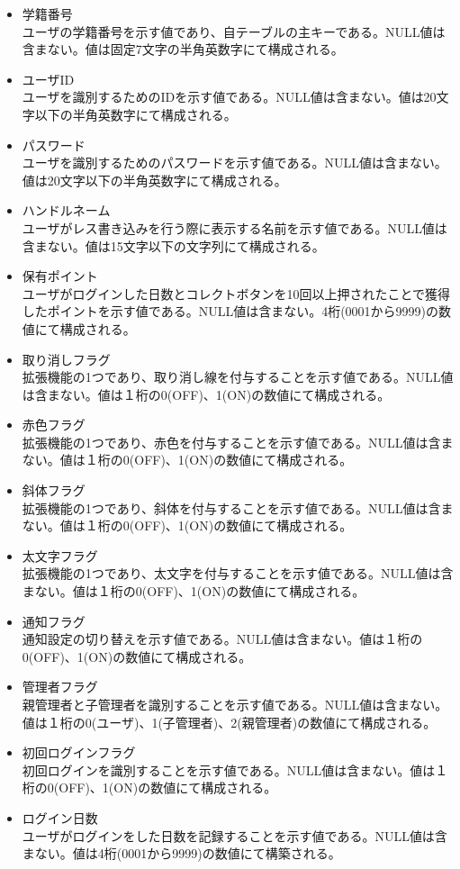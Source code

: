 \documentclass[a4j]{jarticle}
\begin{document}
\begin{itemize}
\item 学籍番号\\
  ユーザの学籍番号を示す値であり、自テーブルの主キーである。NULL値は含まない。値は固定7文字の半角英数字にて構成される。
\item ユーザID\\
  ユーザを識別するためのIDを示す値である。NULL値は含まない。値は20文字以下の半角英数字にて構成される。
\item パスワード\\
  ユーザを識別するためのパスワードを示す値である。NULL値は含まない。値は20文字以下の半角英数字にて構成される。
\item ハンドルネーム\\
      ユーザがレス書き込みを行う際に表示する名前を示す値である。NULL値は含まない。値は15文字以下の文字列にて構成される。


\item 保有ポイント\\
  ユーザがログインした日数とコレクトボタンを10回以上押されたことで獲得したポイントを示す値である。NULL値は含まない。4桁(0001から9999)の数値にて構成される。

\item 取り消しフラグ\\
  拡張機能の1つであり、取り消し線を付与することを示す値である。NULL値は含まない。値は１桁の0(OFF)、1(ON)の数値にて構成される。

\item 赤色フラグ\\
  拡張機能の1つであり、赤色を付与することを示す値である。NULL値は含まない。値は１桁の0(OFF)、1(ON)の数値にて構成される。\\
\item 斜体フラグ\\
  拡張機能の1つであり、斜体を付与することを示す値である。NULL値は含まない。値は１桁の0(OFF)、1(ON)の数値にて構成される。

\item 太文字フラグ\\
  拡張機能の1つであり、太文字を付与することを示す値である。NULL値は含まない。値は１桁の0(OFF)、1(ON)の数値にて構成される。
\item 通知フラグ\\
  通知設定の切り替えを示す値である。NULL値は含まない。値は１桁の0(OFF)、1(ON)の数値にて構成される。
\item 管理者フラグ\\
  親管理者と子管理者を識別することを示す値である。NULL値は含まない。値は１桁の0(ユーザ)、1(子管理者)、2(親管理者)の数値にて構成される。\\
\item 初回ログインフラグ\\
  初回ログインを識別することを示す値である。NULL値は含まない。値は１桁の0(OFF)、1(ON)の数値にて構成される。

\item ログイン日数\\
  ユーザがログインをした日数を記録することを示す値である。NULL値は含まない。値は4桁(0001から9999)の数値にて構築される。

  　\end{itemize}
\newpage
\end{document}
